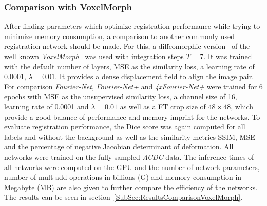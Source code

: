 \subsubsection{Comparison with VoxelMorph} \label{SubSubSec:ComparisonVoxelMorph}
After finding parameters which optimize registration performance while trying to minimize memory consumption, a comparison to another commonly used registration network should be made. For this, a diffeomorphic version~\cite{VoxelMorphDiff} of the well known \emph{VoxelMorph}~\cite{Voxelmorph} was used with integration steps $T=7$. It was trained with the default number of layers, MSE as the similarity loss, a learning rate of 0.0001, $\lambda=0.01$. It provides a dense displacement field to align the image pair. For comparison \emph{Fourier-Net}, \emph{Fourier-Net+} and \emph{4xFourier-Net+} were trained for 6 epochs with MSE as the unsupervised similarity loss, a channel size of 16, learning rate of 0.0001 and $\lambda=0.01$ as well as a FT crop size of $48 \times 48$, which provide a good balance of performance and memory imprint for the networks. To evaluate registration performance, the Dice score was again computed for all labels and without the background as well as the similarity metrics SSIM, MSE and the percentage of negative Jacobian determinant of deformation. All networks were trained on the fully sampled \emph{ACDC} data. The inference times of all networks were computed on the GPU and the number of network parameters, number of mult-add operations in billions (G) and memory consumption in Megabyte (MB) are also given to further compare the efficiency of the networks. The results can be seen in section~\ref{SubSec:ResultsComparisonVoxelMorph}.


